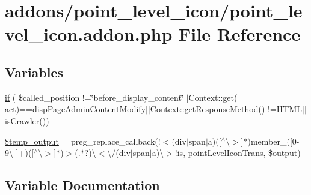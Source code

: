 \hypertarget{point__level__icon_8addon_8php}{}\section{addons/point\+\_\+level\+\_\+icon/point\+\_\+level\+\_\+icon.addon.\+php File Reference}
\label{point__level__icon_8addon_8php}
\subsection*{Variables}
\begin{DoxyCompactItemize}
\item 
\hyperlink{point__level__icon_8addon_8php_a343bf9bf16148d253aa65319de0b3f16}{if} ( \$called\+\_\+position !=\char`\"{}before\+\_\+display\+\_\+content\char`\"{}$\vert$$\vert$Context\+::get( \textquotesingle{}act\textquotesingle{})==\textquotesingle{}disp\+Page\+Admin\+Content\+Modify\textquotesingle{}$\vert$$\vert$\hyperlink{classContext_a1d02a15209360034cd719d8b08cb5061}{Context\+::get\+Response\+Method}() !=\textquotesingle{}H\+T\+ML\textquotesingle{}$\vert$$\vert$\hyperlink{func_8inc_8php_a490ffbd4821da1995c76c381553d5b3d}{is\+Crawler}())
\item 
\hyperlink{point__level__icon_8addon_8php_a5866ef6f77cbeaf87d8208cf805bbc3d}{\$temp\+\_\+output} = preg\+\_\+replace\+\_\+callback(\textquotesingle{}!$<$(div$\vert$span$\vert$a)(\mbox{[}$^\wedge$\textbackslash{}$>$\mbox{]}$\ast$)member\+\_\+(\mbox{[}0-\/9\textbackslash{}-\/\mbox{]}+)(\mbox{[}$^\wedge$\textbackslash{}$>$\mbox{]}$\ast$)$>$(.$\ast$?)\textbackslash{}$<$\textbackslash{}/(div$\vert$span$\vert$a)\textbackslash{}$>$!is\textquotesingle{}, \textquotesingle{}\hyperlink{point__level__icon_8lib_8php_a6581bcaf11de4c31924e7a5de3d6887d}{point\+Level\+Icon\+Trans}\textquotesingle{}, \$output)
\end{DoxyCompactItemize}


\subsection{Variable Documentation}
\mbox{\label{point__level__icon_8addon_8php_a5866ef6f77cbeaf87d8208cf805bbc3d}} 
